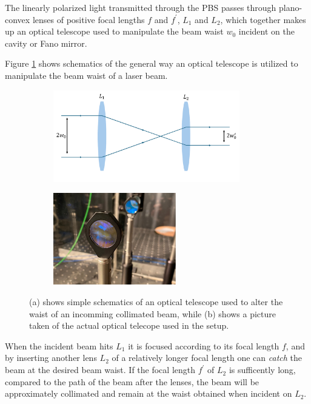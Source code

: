 The linearly polarized light transmitted through the PBS passes through plano-convex lenses of positive focal lengths $f$ and $f^{\prime}$, $L_1$ and $L_2$, which together makes up an optical telescope used to manipulate the beam waist $w_0$ incident on the cavity or Fano mirror. 

Figure \ref{fig:telescope} shows schematics of the general way an optical telescope is utilized to manipulate the beam waist of a laser beam.

\begin{figure}[h!]
    \begin{subfigure}[b]{0.49\textwidth}
        \centering
        \includegraphics[height=4cm]{figures/optical_telescope.pdf}
        \caption{}
        \label{fig:telescope}
    \end{subfigure}
    \begin{subfigure}[b]{0.49\textwidth}
        \centering
        \includegraphics[height=4cm]{figures/optical_telescope_picture.pdf}
        \caption{}
        \label{fig:telescope_picture}
    \end{subfigure}
    \caption{(a) shows simple schematics of an optical telescope used to alter the waist of an incomming collimated beam, while (b) shows a picture taken of the actual optical telecope used in the setup.}
    \label{fig:telescope_sketch_and_pic}
\end{figure}

When the incident beam hits $L_1$ it is focused according to its focal length $f$, and by inserting another lens $L_2$ of a relatively longer focal length one can \emph{catch} the beam at the desired beam waist. If the focal length $f^{\prime}$ of $L_2$ is sufficently long, compared to the path of the beam after the lenses, the beam will be approximately collimated and remain at the waist obtained when incident on $L_2$.

